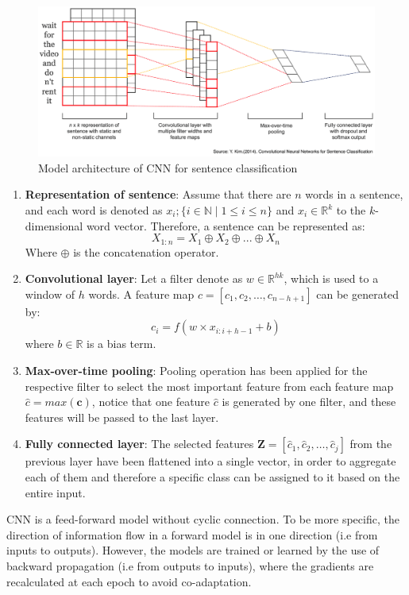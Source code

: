 \documentclass[]{krantz}
\begin{document}
\begin{figure}[ht]

{\centering \includegraphics[width=0.7\linewidth]{figures/01-03-cnns-and-their-applications-in-nlp/CNN_Sentence_Classification} 

}

\caption{Model architecture of CNN for sentence classification}\label{fig:figs-7}
\end{figure}

\begin{enumerate}
\def\labelenumi{\arabic{enumi}.}
\item
  \textbf{Representation of sentence}: Assume that there are \(n\) words in a sentence, and each word is denoted as \(x_{i};\{i \in \mathbb{N} \mid 1 \leq i \leq n \}\) and \(x_{i} \in \mathbb{R}^{k}\) to the \(k\)-dimensional word vector. Therefore, a sentence can be represented as:
  \[ X_{1:n}=X_{1} \oplus X_{2} \oplus ... \oplus X_{n} \]
  Where \(\oplus\) is the concatenation operator.
\item
  \textbf{Convolutional layer}: Let a filter denote as \(w \in \mathbb{R}^{hk}\), which is used to a window of \(h\) words. A feature map \(c=[c_1,c_2,…,c_{n-h+1}]\) can be generated by:
  \[ c_i=f(w×x_{i:i+h-1}+b) \]
  where \(b \in \mathbb{R}\) is a bias term.
\item
  \textbf{Max-over-time pooling}: Pooling operation has been applied for the respective filter to select the most important feature from each feature map \(\hat{c} =max(\boldsymbol{c})\), notice that one feature \(\hat{c}\) is generated by one filter, and these features will be passed to the last layer.
\item
  \textbf{Fully connected layer}: The selected features \(\boldsymbol{Z}=[\hat{c}_1,\hat{c}_2,…,\hat{c}_j]\) from the previous layer have been flattened into a single vector, in order to aggregate each of them and therefore a specific class can be assigned to it based on the entire input.
\end{enumerate}

CNN is a feed-forward model without cyclic connection. To be more specific, the direction of information flow in a forward model is in one direction (i.e from inputs to outputs). However, the models are trained or learned by the use of backward propagation (i.e from outputs to inputs), where the gradients are recalculated at each epoch to avoid co-adaptation.
\end{document}
